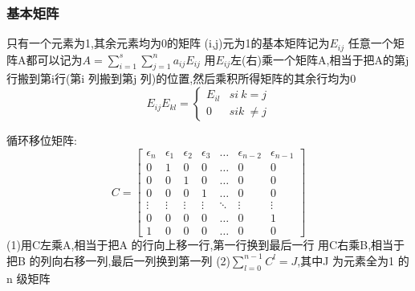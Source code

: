 \documentclass{article}
\begin{document}
\subsubsection{基本矩阵}
只有一个元素为1,其余元素均为0的矩阵 \newline
(i,j)元为1的基本矩阵记为$E_{ij}$
任意一个矩阵A都可以记为$A=\sum_{i=1}^s {\sum_{j=1}^n {a_{ij}E_{ij}}}$
\newline
用$E_{ij}$左(右)乘一个矩阵A,相当于把A的第j行搬到第i行(第i 列搬到第j 列)的位置,然后乘积所得矩阵的其余行均为0 \newline
$$
E_{ij}E_{kl}=
\begin{cases}
  E_{il} & si~ k=j \\
  0 & si k ~\neq j
\end{cases}
$$

\begin{question}
  循环移位矩阵:
  $$
  C=
  \begin{bmatrix}
    \epsilon_n & \epsilon_1 & \epsilon_2 & \epsilon_3 & \dots & \epsilon_{n-2} & \epsilon_{n-1} \\
    \hline
        0      &     1      &     0      &       0    & \dots &      0         &       0        \\
        0      &     0      &     1      &       0    & \dots &      0         &       0        \\
        0      &     0      &     0      &       1    & \dots &      0         &       0        \\
        \vdots &    \vdots  &     \vdots &     \vdots & \ddots&      \vdots    &       \vdots   \\
        0      &     0      &     0      &       0    & \dots &      0         &       1        \\
        1      &     0      &     0      &       0    & \dots &      0         &       0
  \end{bmatrix}
  $$
  (1)用C左乘A,相当于把A 的行向上移一行,第一行换到最后一行 \newline
  用C右乘B,相当于把B 的列向右移一列,最后一列换到第一列 \newline
  (2)$\sum_{l=0}^{n-1} C^l=J$,其中J 为元素全为1 的n 级矩阵
\end{question}
\end{document}
